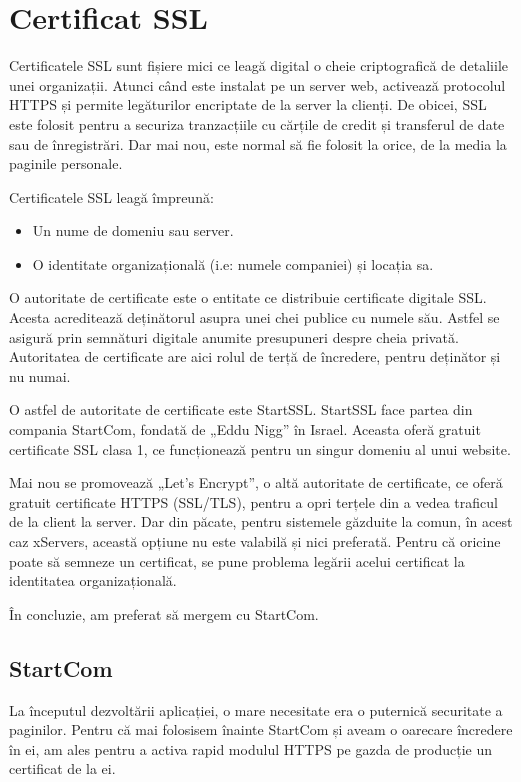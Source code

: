 \section{Certificat SSL}
	Certificatele SSL sunt fișiere mici ce leagă digital o cheie criptografică de detaliile unei organizații.
	Atunci când este instalat pe un server web, activează protocolul HTTPS și permite legăturilor encriptate de la server la clienți.
	De obicei, SSL este folosit pentru a securiza tranzacțiile cu cărțile de credit și transferul de date sau de înregistrări.
	Dar mai nou, este normal să fie folosit la orice, de la media la paginile personale.\cite{ssl}

	Certificatele SSL leagă împreună:

	\begin{itemize}
		\item Un nume de domeniu sau server.
		\item O identitate organizațională (i.e: numele companiei) și locația sa.
	\end{itemize}

	O autoritate de certificate este o entitate ce distribuie certificate digitale SSL.
	Acesta acreditează deținătorul asupra unei chei publice cu numele său.
	Astfel se asigură prin semnături digitale anumite presupuneri despre cheia privată.
	Autoritatea de certificate are aici rolul de terță de încredere, pentru deținător și nu numai.

	O astfel de autoritate de certificate este StartSSL.
	StartSSL face partea din compania StartCom, fondată de „Eddu Nigg” în Israel.
	Aceasta oferă gratuit certificate SSL clasa 1, ce funcționează pentru un singur domeniu al unui website.

	Mai nou se promovează „Let's Encrypt”, o altă autoritate de certificate, ce oferă gratuit certificate HTTPS (SSL/TLS), pentru a opri terțele din a vedea traficul de la client la server.
	Dar din păcate, pentru sistemele găzduite la comun, în acest caz xServers, această opțiune nu este valabilă și nici preferată.
	Pentru că oricine poate să semneze un certificat, se pune problema legării acelui certificat la identitatea organizațională.

	În concluzie, am preferat să mergem cu StartCom.

	\subsection{StartCom}

		La începutul dezvoltării aplicației, o mare necesitate era o puternică securitate a paginilor.
		Pentru că mai folosisem înainte StartCom și aveam o oarecare încredere în ei, am ales pentru a activa rapid modulul HTTPS pe gazda de producție un certificat de la ei.

